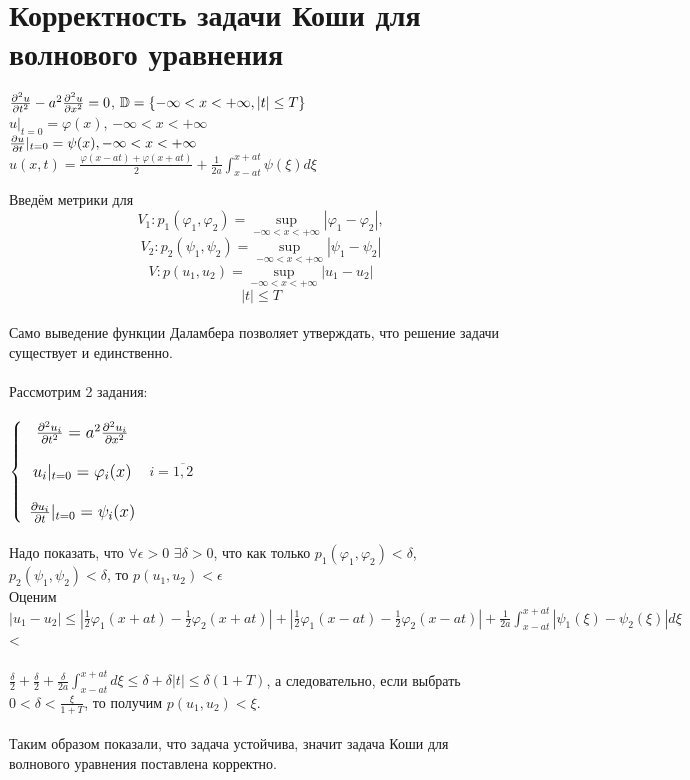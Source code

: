 \documentclass[../main.tex]{subfiles}
\begin{document}
\section{Корректность задачи Коши для волнового уравнения}
\begin{large}
    \begin{center}
        $\frac{\partial^2 u}{\partial t^2}-a^2\frac{\partial^2 u}{\partial x^2}=0$, $\mathbb{D}=\{ -\infty<x<+\infty, |t|\leq T\rbrace$\\
        $ $\\
        $ u|_{t=0} = \varphi(x)$, $-\infty<x<+\infty$\\ 
        $ $\\
        $\frac{\partial u}{\partial t}|_{t=0} = \psi(x),  -\infty<x<+\infty$\\
        $ $\\
        $u(x,t)=\frac{\varphi(x-at)+\varphi(x+at)}{2}+\frac{1}{2a}\int_{x-at}^{x+at}\psi(\xi)d\xi$
    \end{center}
\end{large}
Введём метрики для \[V_1:p_1(\varphi_1,\varphi_2)=\sup_{-\infty<x<+\infty}|\varphi_1-\varphi_2|,\] \[V_2:p_2(\psi_1,\psi_2)=\sup_{-\infty<x<+\infty}|\psi_1-\psi_2|\]\[V:p(u_1,u_2)=\sup_{-\infty<x<+\infty}|u_1-u_2|\]\[ |t| \leq T\]\\
Само выведение функции Даламбера позволяет утверждать, что решение задачи существует и единственно.\\\\
    Рассмотрим 2 задания:\\\\
$
\begin{large}
\begin{left}
\lbrace
\begin{array}{cc}
     \pderivt{u_i}{t}=a^2\pderivt{u_i}{x}\\\\
     u_i|_{t=0}=\varphi_i(x)\\\\
     \pderiv{u_i}{t}|_{t=0}=\psi_i(x)
\end{array}
\right.
\end{left}  
\end{large}
$
$i=\overline{1,2}$\\ \\
Надо показать, что $\forall \epsilon > 0$  $\exists \delta > 0$,  что как только $p_1(\varphi_1, \varphi_2)<\delta$, $p_2(\psi_1, \psi_2)<\delta$, то $p(u_1, u_2)<\epsilon$\\
Оценим\\
$|u_1-u_2| \leq |\frac{1}{2}\varphi_1(x+at)-\frac{1}{2}\varphi_2(x+at)|+|\frac{1}{2}\varphi_1(x-at)-\frac{1}{2}\varphi_2(x-at)|+\frac{1}{2a}\int_{x-at}^{x+at}|\psi_1(\xi)-\psi_2(\xi)|d\xi$<\\\\$\frac{\delta}{2}+\frac{\delta}{2}+\frac{\delta}{2a}\int_{x-at}^{x+at}d\xi \leq \delta+\delta|t| \leq \delta(1+T)$, а следовательно, если выбрать  $0<\delta<\frac{\xi}{1+T}$, то получим $p(u_1, u_2)<\xi$.\\\\
Таким образом показали, что задача устойчива, значит задача Коши для волнового уравнения поставлена корректно.
\end{document}
